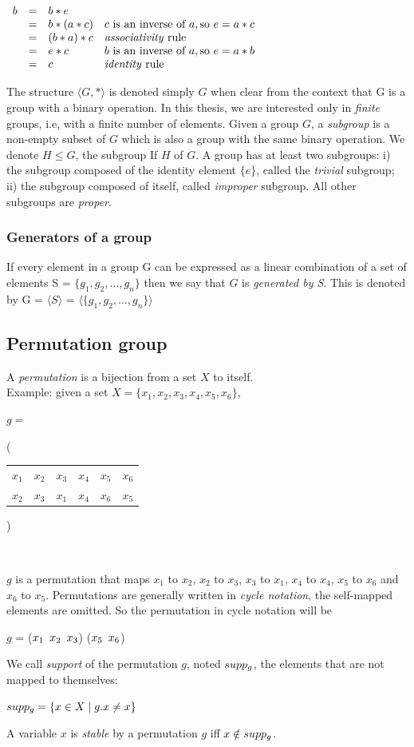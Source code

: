 $\begin{array}{lcll}     
b & = & b * e & \\
& = & b * (a * c) & c \text{ is an inverse of } a, \text{so } e = a * c\\
& = & (b * a) * c &   \text{\emph{associativity} rule}\\
& = & e * c       & b \text{ is an inverse of } a, \text{so } e = a * b\\
& = & c           &   \text{\emph{identity} rule}
\end{array}$

The structure $\langle G, * \rangle$ is denoted simply $G$ when clear from the context that G is a group
with a binary operation. In this thesis, we are interested only in \emph{finite} groups, i.e,
with a finite number of elements.
Given a group $G$, a \emph{subgroup} is a non-empty subset of $G$ which is also a group with 
the same binary operation. We denote $H \leq G$, the subgroup If $H$ of $G$.
A group has at least two subgroups: i) the subgroup composed of the identity element $\{e\}$, called the \emph{trivial} subgroup; ii) the subgroup composed of itself, called \emph{improper} subgroup. All other subgroups are \emph{proper}.

\subsubsection{Generators of a group}
If every element in a group G can be expressed as a linear combination
of a set of elements S = $\{g_1, g_2, ..., g_n \}$ then we say that $G$ is 
\textit{generated by S}. This is denoted by G = $\langle S \rangle$ =
$\langle \{g_1, g_2, ..., g_n \} \rangle$ 

\subsection{Permutation group}
A \emph{permutation} is a bijection from a set $X$ to itself.\\
Example: given a set $X = \{x_1, x_2, x_3, x_4, x_5, x_6\}$,
\begin{center}
$g = ${\Bigg( \begin{tabular}{cccccc}
  $x_1$ & $x_2$ & $x_3$ & $x_4$ & $x_5$ & $x_6$\\
  $x_2$ & $x_3$ & $x_1$ & $x_4$ & $x_6$ & $x_5$
 \end{tabular} \Bigg)}\\
\end{center}
$g$ is a permutation that maps $x_1$ to $x_2$, $x_2$ to $x_3$, $x_3$ to $x_1$, $x_4$ to $x_4$, $x_5$ to $x_6$ and $x_6$ to $x_5$.
Permutations are generally written in \emph{cycle notation}, the self-mapped elements are omitted.
So the permutation in cycle notation will be 
\begin{center}
 $g$ = ($x_1 \enskip x_2 \enskip x_3$) ($x_5 \enskip x_6$)
\end{center}
We call \emph{support} of the permutation $g$, noted $supp_{g}$, the elements that are not mapped to themselves:
\begin{center}
 $supp_{g} = \{ x \in X \mid g.x \neq x\}$
\end{center}
A variable $x$ is \emph{stable} by a permutation $g$ 
iff $x \notin supp_g$.

